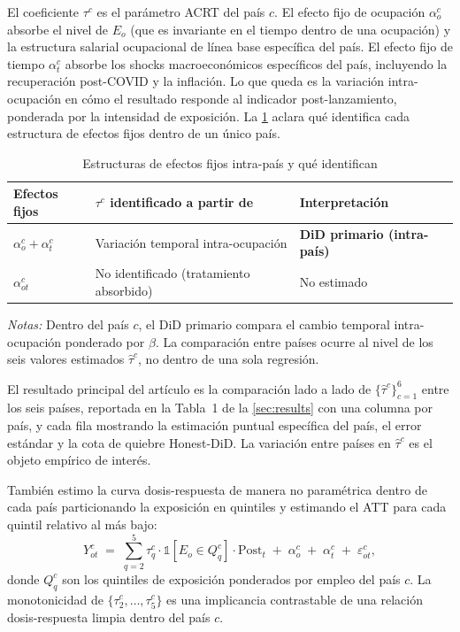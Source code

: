 El coeficiente $\tau^c$ es el parámetro ACRT del país $c$. El efecto fijo de ocupación $\alpha_{o}^c$ absorbe el nivel de $E_o$ (que es invariante en el tiempo dentro de una ocupación) y la estructura salarial ocupacional de línea base específica del país. El efecto fijo de tiempo $\alpha_{t}^c$ absorbe los shocks macroeconómicos específicos del país, incluyendo la recuperación post-COVID y la inflación. Lo que queda es la variación intra-ocupación en cómo el resultado responde al indicador post-lanzamiento, ponderada por la intensidad de exposición. La \cref{tab:fe_identification} aclara qué identifica cada estructura de efectos fijos dentro de un único país.

\begin{table}[H]
\centering
\small
\begin{threeparttable}
\caption{Estructuras de efectos fijos intra-país y qué identifican}
\label{tab:fe_identification}
\begin{tabular}{lll}
\toprule
Efectos fijos & $\tau^c$ identificado a partir de & Interpretación \\
\midrule
$\alpha_{o}^c + \alpha_{t}^c$ & Variación temporal intra-ocupación & \textbf{DiD primario (intra-país)} \\
$\alpha_{ot}^c$ & No identificado (tratamiento absorbido) & No estimado \\
\bottomrule
\end{tabular}
\begin{tablenotes}[flushleft]
\footnotesize
\item \emph{Notas:} Dentro del país $c$, el DiD primario compara el cambio temporal intra-ocupación ponderado por $\beta$. La comparación entre países ocurre al nivel de los seis valores estimados $\hat\tau^c$, no dentro de una sola regresión.
\end{tablenotes}
\end{threeparttable}
\end{table}

El resultado principal del artículo es la comparación lado a lado de $\{\hat\tau^c\}_{c=1}^6$ entre los seis países, reportada en la Tabla~1 de la \cref{sec:results} con una columna por país, y cada fila mostrando la estimación puntual específica del país, el error estándar y la cota de quiebre Honest-DiD. La variación entre países en $\hat\tau^c$ es el objeto empírico de interés.

También estimo la curva dosis-respuesta de manera no paramétrica dentro de cada país particionando la exposición en quintiles y estimando el ATT para cada quintil relativo al más bajo:
\begin{equation}
Y_{ot}^c \;=\; \sum_{q=2}^{5} \tau_q^c \cdot \mathbb{1}[E_{o} \in Q_q^c] \cdot \text{Post}_t \;+\; \alpha_{o}^c \;+\; \alpha_{t}^c \;+\; \varepsilon_{ot}^c,
\label{eq:dose_response}
\end{equation}
donde $Q_q^c$ son los quintiles de exposición ponderados por empleo del país $c$. La monotonicidad de $\{\tau_2^c, \ldots, \tau_5^c\}$ es una implicancia contrastable de una relación dosis-respuesta limpia dentro del país $c$.

